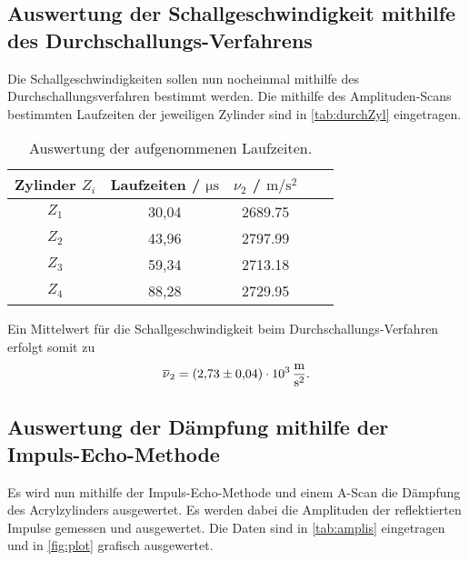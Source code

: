 \subsection{Auswertung der Schallgeschwindigkeit mithilfe des Durchschallungs-Verfahrens}
\label{subsec:schallDurch}

Die Schallgeschwindigkeiten sollen nun nocheinmal mithilfe des Durchschallungsverfahren bestimmt werden.
Die mithilfe des Amplituden-Scans bestimmten Laufzeiten der jeweiligen Zylinder sind in \autoref{tab:durchZyl} eingetragen.

\begin{table}
  \centering
  \caption{Auswertung der aufgenommenen Laufzeiten.}
  \label{tab:durchZyl}
  \begin{tabular}{c c c c c}
    \toprule
    Zylinder $Z_i$ &  Laufzeiten / $\si{\micro\second}$ & $\nu_2$ / $\si{\meter\per\second\squared} $\\
    \midrule
    $Z_1$ & 30,04 & 2689.75 \\
    $Z_2$ & 43,96 & 2797.99 \\
    $Z_3$ & 59,34 & 2713.18 \\
    $Z_4$ & 88,28 & 2729.95 \\
    \bottomrule
  \end{tabular}
\end{table}

Ein Mittelwert für die Schallgeschwindigkeit beim Durchschallungs-Verfahren erfolgt somit zu
\begin{align*}
  \overline \nu_2 = \SI{2,73 \pm 0,04 e3}{\meter\per\second\squared}.
\end{align*}

\subsection{Auswertung der Dämpfung mithilfe der Impuls-Echo-Methode}
\label{subsec:daempfung}

Es wird nun mithilfe der Impuls-Echo-Methode und einem A-Scan die Dämpfung des Acrylzylinders ausgewertet.
Es werden dabei die Amplituden der reflektierten Impulse gemessen und ausgewertet. Die Daten sind in \autoref{tab:amplis} eingetragen und in \autoref{fig:plot}
grafisch ausgewertet.

